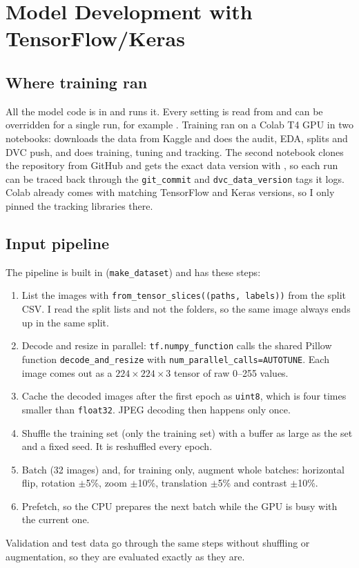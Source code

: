\chapter{Model Development with TensorFlow/Keras}\label{ch:model}

\section*{Where training ran}\label{sec:2-0}
All the model code is in  and  runs it. Every
setting is read from  and can be overridden for a single run, for example
. Training ran on a Colab T4 GPU in two notebooks:
 downloads the data from Kaggle and does the audit, EDA,
splits and DVC push, and  does training, tuning and tracking.
The second notebook clones the repository from GitHub and gets the exact data version with
, so each run can be traced back through the \texttt{git\_commit} and
\texttt{dvc\_data\_version} tags it logs. Colab already comes with matching TensorFlow and Keras
versions, so I only pinned the tracking libraries there.

\section{Input pipeline}
The pipeline is built in  (\texttt{make\_dataset}) and has these
steps:
\begin{enumerate}
\item List the images with \texttt{from\_tensor\_slices((paths, labels))} from the split CSV. I
read the split lists and not the folders, so the same image always ends up in the same split.
\item Decode and resize in parallel: \texttt{tf.numpy\_function} calls the shared Pillow function
\texttt{decode\_and\_resize} with \texttt{num\_parallel\_calls=AUTOTUNE}. Each image comes out as a
$224\times224\times3$ tensor of raw 0--255 values.
\item Cache the decoded images after the first epoch as \texttt{uint8}, which is four times
smaller than \texttt{float32}. JPEG decoding then happens only once.
\item Shuffle the training set (only the training set) with a buffer as large as the set and a
fixed seed. It is reshuffled every epoch.
\item Batch (32 images) and, for training only, augment whole batches: horizontal flip, rotation
$\pm$5\%, zoom $\pm$10\%, translation $\pm$5\% and contrast $\pm$10\%.
\item Prefetch, so the CPU prepares the next batch while the GPU is busy with the current one.
\end{enumerate}
Validation and test data go through the same steps without shuffling or augmentation, so they are
evaluated exactly as they are.


